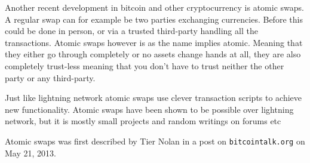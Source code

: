 
Another recent development in bitcoin and other cryptocurrency is atomic swaps.
A regular swap can for example be two parties exchanging currencies. Before
this could be done in person, or via a trusted third-party handling all the
transactions. Atomic swaps however is as the name implies atomic. Meaning that
they either go through completely or no assets change hands at all, they are
also completely trust-less meaning that you don't have to trust neither the
other party or any third-party.

Just like lightning network atomic swaps use clever transaction scripts to
achieve new functionality. Atomic swaps have been shown to be possible over
lightning network, but it is mostly small projects and random writings on
forums etc

Atomic swaps was first described by Tier Nolan in a post on
\texttt{bitcointalk.org} on May 21, 2013.\cite{tier_nolan}
